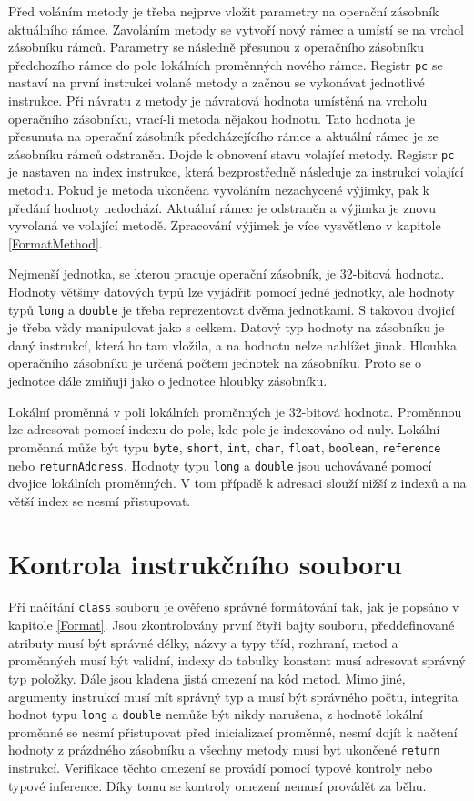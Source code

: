 Před voláním metody je třeba nejprve vložit parametry na operační zásobník aktuálního rámce. Zavoláním metody se vytvoří nový rámec a umístí se na vrchol zásobníku rámců. Parametry se následně přesunou z operačního zásobníku předchozího rámce do pole lokálních proměnných nového rámce. Registr \texttt{pc} se nastaví na první instrukci volané metody a začnou se vykonávat jednotlivé instrukce. Při návratu z metody je návratová hodnota umístěná na vrcholu operačního zásobníku, vrací-li metoda nějakou hodnotu. Tato hodnota je přesunuta na operační zásobník předcházejícího rámce a aktuální rámec je ze zásobníku rámců odstraněn. Dojde k obnovení stavu volající metody. Registr \texttt{pc} je nastaven na index instrukce, která bezprostředně následuje za instrukcí volající metodu. Pokud je metoda ukončena vyvoláním nezachycené výjimky, pak k předání hodnoty nedochází. Aktuální rámec je odstraněn a výjimka je znovu vyvolaná ve volající metodě. Zpracování výjimek je více vysvětleno v kapitole \ref{FormatMethod}.


Nejmenší jednotka, se kterou pracuje operační zásobník, je 32-bitová hodnota. Hodnoty většiny datových typů lze vyjádřit pomocí jedné jednotky, ale hodnoty typů \texttt{long} a \texttt{double} je třeba reprezentovat dvěma jednotkami. S takovou dvojicí je třeba vždy manipulovat jako s celkem. Datový typ hodnoty na zásobníku je daný instrukcí, která ho tam vložila, a na hodnotu nelze nahlížet jinak. Hloubka operačního zásobníku je určená počtem jednotek na zásobníku. Proto se o jednotce dále zmiňuji jako o jednotce hloubky zásobníku.

Lokální proměnná v poli lokálních proměnných je 32-bitová hodnota. Proměnnou lze adresovat pomocí indexu do pole, kde pole je indexováno od nuly. Lokální proměnná může být typu \texttt{byte}, \texttt{short}, \texttt{int}, \texttt{char}, \texttt{float}, \texttt{boolean}, \texttt{reference} nebo \texttt{returnAddress}. Hodnoty typu \texttt{long} a \texttt{double} jsou uchovávané pomocí dvojice lokálních proměnných. V tom případě k adresaci slouží nižší z indexů a na větší index se nesmí přistupovat. 


\section{Kontrola instrukčního souboru}\label{JVMVerification}

Při načítání \texttt{class} souboru je ověřeno správné formátování tak, jak je popsáno v kapitole \ref{Format}. Jsou zkontrolovány první čtyři bajty souboru, předdefinované atributy musí být správné délky, názvy a typy tříd, rozhraní, metod a proměnných musí být validní, indexy do tabulky konstant musí adresovat správný typ položky. Dále jsou kladena jistá omezení na kód metod. Mimo jiné, argumenty instrukcí musí mít správný typ a musí být správného počtu, integrita hodnot typu \texttt{long} a \texttt{double} nemůže být nikdy narušena, z hodnotě lokální proměnné se nesmí přistupovat před inicializací proměnné, nesmí dojít k načtení hodnoty z prázdného zásobníku a všechny metody musí byt ukončené \texttt{return} instrukcí. Verifikace těchto omezení se provádí pomocí typové kontroly nebo typové inference. Díky tomu se kontroly omezení nemusí provádět za běhu.


